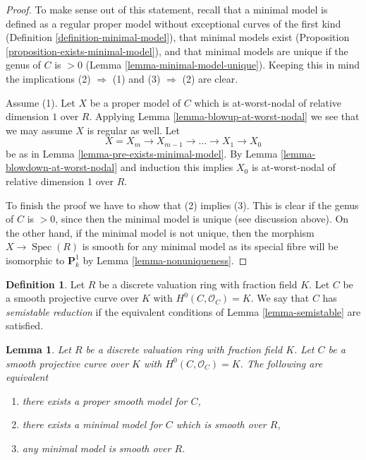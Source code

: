 \documentclass{stacks-project}
\theoremstyle{plain}
\newtheorem{lemma}[subsection]{Lemma}
\theoremstyle{definition}
\newtheorem{definition}[subsection]{Definition}
\theoremstyle{remark}
\numberwithin{equation}{subsection}
\def\Spec{\mathop{\mathrm{Spec}}}
\begin{document}
\begin{proof}
To make sense out of this statement, recall that a
minimal model is defined as a regular proper model
without exceptional curves of the first kind
(Definition \ref{definition-minimal-model}),
that minimal models exist
(Proposition \ref{proposition-exists-minimal-model}), and
that minimal models are unique if the genus
of $C$ is $> 0$ (Lemma \ref{lemma-minimal-model-unique}).
Keeping this in mind the implications (2) $\Rightarrow$ (1)
and (3) $\Rightarrow$ (2) are clear.

\medskip\noindent
Assume (1). Let $X$ be a proper model of $C$ which is
at-worst-nodal of relative dimension $1$ over $R$.
Applying Lemma \ref{lemma-blowup-at-worst-nodal}
we see that we may assume $X$ is regular as well.
Let
$$
X = X_m \to X_{m - 1} \to \ldots \to X_1 \to X_0
$$
be as in Lemma \ref{lemma-pre-exists-minimal-model}.
By Lemma \ref{lemma-blowdown-at-worst-nodal} and induction
this implies $X_0$ is at-worst-nodal of relative dimension $1$ over $R$.

\medskip\noindent
To finish the proof we have to show that (2) implies (3).
This is clear if the genus of $C$ is $> 0$, since then
the minimal model is unique (see discussion above).
On the other hand, if the minimal model is not unique, then
the morphism $X \to \Spec(R)$ is smooth for any minimal model
as its special fibre will be isomorphic to $\mathbf{P}^1_k$
by Lemma \ref{lemma-nonuniqueness}.
\end{proof}

\begin{definition}
\label{definition-semistable}
Let $R$ be a discrete valuation ring with fraction field $K$.
Let $C$ be a smooth projective curve over $K$ with $H^0(C, \mathcal{O}_C) = K$.
We say that $C$ has {\it semistable reduction} if the equivalent
conditions of Lemma \ref{lemma-semistable} are satisfied.
\end{definition}

\begin{lemma}
\label{lemma-good}
Let $R$ be a discrete valuation ring with fraction field $K$.
Let $C$ be a smooth projective curve over $K$ with $H^0(C, \mathcal{O}_C) = K$.
The following are equivalent
\begin{enumerate}
\item there exists a proper smooth model for $C$,
\item there exists a minimal model for $C$ which is smooth over $R$,
\item any minimal model is smooth over $R$.
\end{enumerate}
\end{lemma}
\end{document}

